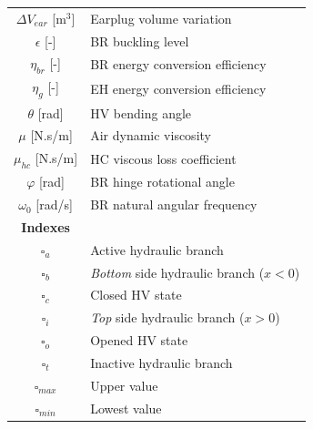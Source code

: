 \documentclass[3p,twocolumn,preprint]{elsarticle}
\begin{document}
\begin{table}
\begin{minipage}{.5\textwidth}
\begin{tabular}{ c  m{6cm} }
		$\Delta V_{ear}$ [m$^3$] & Earplug volume variation                                \\
		$\epsilon$ [-]           & BR buckling level                                       \\
		$\eta_{br}$ [-]          & BR energy conversion efficiency                         \\
		$\eta_g$ [-]             & EH energy conversion efficiency                      \\
		$\theta$ [rad]           & HV bending angle                                        \\
		$\mu$ [N.s/m]             & Air dynamic viscosity                                   \\
		$\mu_{hc}$ [N.s/m]        & HC viscous loss coefficient                             \\
		$\varphi$ [rad]			 & BR hinge rotational angle							   \\
		$\omega_0$ [rad/s]       & BR natural angular frequency                            \\
		\textbf{Indexes}         &                                                         \\
		$\square_a$              & Active hydraulic branch                                 \\
		$\square_b$              & \emph{Bottom} side hydraulic branch ($x <0$)            \\
		$\square_c$              & Closed HV state              						   \\
		$\square_i$              & \emph{Top} side hydraulic branch ($x >0$)               \\
		$\square_o$              & Opened HV state             							   \\
		$\square_t$              & Inactive hydraulic branch                               \\
		$\square_{max}$          & Upper value                                             \\
		$\square_{min}$          & Lowest value                                            \\
	\end{tabular}
\end{minipage}
		\begin{center}
			\noindent\makebox[\linewidth]{\rule{\textwidth}{0.4pt}}
		\end{center}
\end{table}
\end{document}
